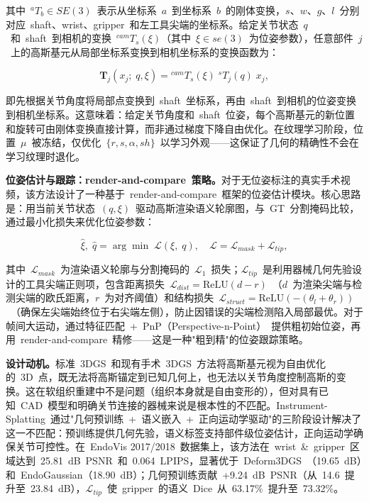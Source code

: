 其中~${}^{a}T_b \in SE(3)$~表示从坐标系~$a$~到坐标系~$b$~的刚体变换，$s$、$w$、$g$、$l$~分别对应~shaft、wrist、gripper~和左工具尖端的坐标系。给定关节状态~$q$~和~shaft~到相机的变换~${}^{cam}T_s(\xi)$（其中~$\xi \in se(3)$~为位姿参数），任意部件~$j$~上的高斯基元从局部坐标系变换到相机坐标系的变换函数为：

\begin{equation}
\bm{T}_j(x_j;\;q,\xi) = {}^{cam}T_s(\xi)\;{}^{s}T_j(q)\;x_j,
\end{equation}

即先根据关节角度将局部点变换到~shaft~坐标系，再由~shaft~到相机的位姿变换到相机坐标系。这意味着：给定关节角度和~shaft~位姿，每个高斯基元的新位置和旋转可由刚体变换直接计算，而非通过梯度下降自由优化。在纹理学习阶段，位置~$\mu$~被冻结，仅优化~$\{r, s, \alpha, sh\}$~以学习外观——这保证了几何的精确性不会在学习纹理时退化。

\textbf{位姿估计与跟踪：render-and-compare~策略。}对于无位姿标注的真实手术视频，该方法设计了一种基于~render-and-compare~框架的位姿估计模块。核心思路是：用当前关节状态~$(q, \xi)$~驱动高斯渲染语义轮廓图，与~GT~分割掩码比较，通过最小化损失来优化位姿参数：

\begin{equation}
\hat{\xi},\;\hat{q} = \arg\min\;\mathcal{L}(\xi,\;q), \quad \mathcal{L} = \mathcal{L}_{mask} + \mathcal{L}_{tip},
\end{equation}

其中~$\mathcal{L}_{mask}$~为渲染语义轮廓与分割掩码的~$\mathcal{L}_1$~损失；$\mathcal{L}_{tip}$~是利用器械几何先验设计的工具尖端正则项，包含距离损失~$\mathcal{L}_{dist} = \text{ReLU}(d - r)$~（$d$~为渲染尖端与检测尖端的欧氏距离，$r$~为对齐阈值）和结构损失~$\mathcal{L}_{struct} = \text{ReLU}(-(\theta_l + \theta_r))$~（确保左尖端始终位于右尖端左侧），防止因错误的尖端检测陷入局部最优。对于帧间大运动，通过特征匹配~+~PnP（Perspective-n-Point）~提供粗初始位姿，再用~render-and-compare~精修——这是一种"粗到精"的位姿跟踪策略。

\textbf{设计动机。}标准~3DGS~和现有手术~3DGS~方法将高斯基元视为自由优化的~3D~点，既无法将高斯锚定到已知几何上，也无法以关节角度控制高斯的变换。这在软组织重建中不是问题（组织本身就是自由变形的），但对具有已知~CAD~模型和明确关节连接的器械来说是根本性的不匹配。Instrument-Splatting~通过"几何预训练~+~语义嵌入~+~正向运动学驱动"的三阶段设计解决了这一不匹配：预训练提供几何先验，语义标签支持部件级位姿估计，正向运动学确保关节可控性。在~EndoVis 2017/2018~数据集上，该方法在~wrist~\&~gripper~区域达到~25.81~dB~PSNR~和~0.064~LPIPS，显著优于~Deform3DGS~（19.65~dB）和~EndoGaussian（18.90~dB）；几何预训练贡献~+9.24~dB~PSNR（从~14.6~提升至~23.84~dB），$\mathcal{L}_{tip}$~使~gripper~的语义~Dice~从~63.17\%~提升至~73.32\%。

